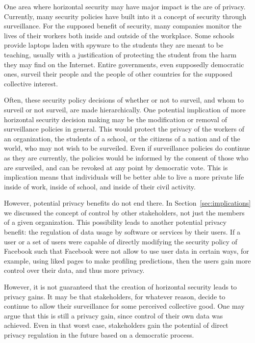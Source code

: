 One area where horizontal security may have major impact is the are of privacy.
Currently, many security policies have built into it a concept of security
through surveillance. For the supposed benefit of security, many companies
monitor the lives of their workers both inside and outside of the workplace.
Some schools provide laptops laden with spyware to the students they are meant
to be teaching, usually with a justification of protecting the student from the
harm they may find on the Internet. Entire governments, even supposedly
democratic ones, surveil their people and the people of other countries for the
supposed collective interest.

Often, these security policy decisions of whether or not to surveil, and whom
to surveil or not surveil, are made hierarchically. One potential implication
of more horizontal security decision making may be the modification or removal
of surveillance policies in general. This would protect the privacy of the
workers of an organization, the students of a school, or the citizens of a
nation and of the world, who may not wish to be surveiled. Even if surveillance
policies do continue as they are currently, the policies would be informed by
the consent of those who are surveiled, and can be revoked at any point by
democratic vote. This is implication means that individuals will be better able
to live a more private life inside of work, inside of school, and inside of
their civil activity.

However, potential privacy benefits do not end there. In 
Section~\ref{sec:implications} we discussed the concept of control by other
stakeholders, not just the members of a given organization. This possibility
leads to another potential privacy benefit: the regulation of data usage by 
software or services by their users. If a user or a set of users were capable of
directly modifying the security policy of Facebook such that Facebook were not
allow to use user data in certain ways, for example, using liked pages to make
profiling predictions, then the users gain more control over their data, and
thus more privacy.

However, it is not guaranteed that the creation of horizontal security leads to
privacy gains. It may be that stakeholders, for whatever reason, decide to
continue to allow their surveillance for some perceived collective good. One may
argue that this is still a privacy gain, since control of their own data was
achieved. Even in that worst case, stakeholders gain the potential of direct
privacy regulation in the future based on a democratic process.
